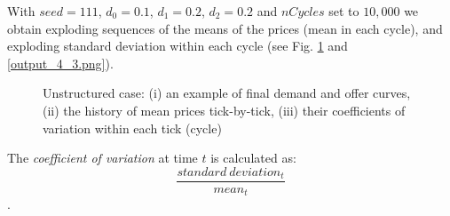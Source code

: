 \documentclass[10pt]{report}
\begin{document}
With $seed=111$,  $d_0=0.1$, $d_1=0.2$, $d_2=0.2$ and $nCycles$ set to $10,000$ we obtain exploding sequences of the means of the prices (mean in each cycle), and exploding standard deviation within each cycle (see Fig. \ref{output_4_2.png} and \ref{output_4_3.png}).

\begin{figure}[H]
\begin{center}
\caption{Unstructured case: (i) an example of final demand and offer curves, (ii) the history of mean prices tick-by-tick, (iii) their coefficients of variation within each tick (cycle)}
\label{output_4_2.png}
\end{center}
\end{figure}

The \emph{coefficient of variation} at time $t$ is calculated as: $$\frac{standard~deviation_t}{mean_t}$$.
\end{document}
